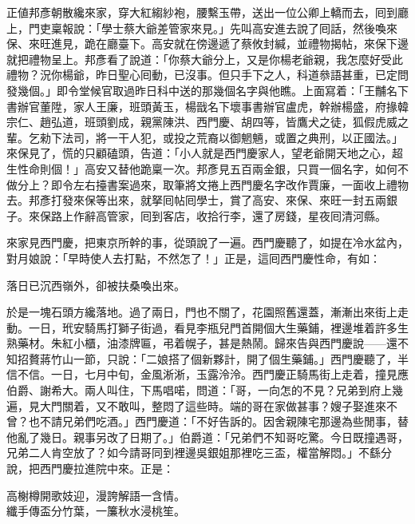 正値邦彥朝散纔來家，穿大紅縐紗袍，腰繫玉帶，送出一位公卿上轎而去，囘到廳上，門吏稟報說：「學士蔡大爺差管家來見。」先叫高安進去說了囘話，然後喚來保、來旺進見，跪在廳臺下。高安就在傍邊遞了蔡攸封緘，並禮物揭帖，來保下邊就把禮物呈上。邦彥看了說道：「你蔡大爺分上，又是你楊老爺親，我怎麼好受此禮物？況你楊爺，昨日聖心囘動，已沒事。但只手下之人，科道叅語甚重，已定問發幾個。」即令堂候官取過昨日科中送的那幾個名字與他瞧。上面寫着：「王黼名下書辦官董陞，家人王廉，班頭黃玉，楊戩名下壞事書辦官盧虎，幹辦楊盛，府掾韓宗仁、趙弘道，班頭劉成，親黨陳洪、西門慶、胡四等，皆鷹犬之徒，狐假虎威之輩。乞勑下法司，將一干人犯，或投之荒裔以御魍魎，或置之典刑，以正國法。」來保見了，慌的只顧磕頭，告道：「小人就是西門慶家人，望老爺開天地之心，超生性命則個！」高安又替他跪稟一次。邦彥見五百兩金銀，只買一個名字，如何不做分上？即令左右擡書案過來，取筆將文捲上西門慶名字改作賈廉，{}一面收上禮物去。邦彥打發來保等出來，就拏囘帖囘學士，賞了高安、來保、來旺一封五兩銀子。來保路上作辭高管家，囘到客店，收拾行李，還了房錢，星夜囘清河縣。

來家見西門慶，把東京所幹的事，從頭說了一遍。西門慶聽了，如提在冷水盆內，對月娘說：「早時使人去打點，不然怎了！」正是，這囘西門慶性命，有如：

\begin{myquote}
落日已沉西嶺外，卻被扶桑喚出來。
\end{myquote}

於是一塊石頭方纔落地。過了兩日，門也不關了，花園照舊還蓋，漸漸出來街上走動。{}一日，玳安騎馬打獅子街過，看見李瓶兒門首開個大生藥鋪，裡邊堆着許多生熟藥材。朱紅小櫃，油漆牌匾，弔着幌子，甚是熱鬧。歸來告與西門慶說——還不知招贅蔣竹山一節，只說：「二娘搭了個新夥計，開了個生藥鋪。」{}西門慶聽了，半信不信。一日，七月中旬，金風淅淅，玉露泠泠。西門慶正騎馬街上走着，撞見應伯爵、謝希大。兩人叫住，下馬唱喏，問道：「哥，一向怎的不見？兄弟到府上幾遍，見大門關着，又不敢叫，整悶了這些時。端的哥在家做甚事？嫂子娶進來不曾？也不請兄弟們吃酒。」西門慶道：「不好告訴的。因舍親陳宅那邊為些閒事，替他亂了幾日。親事另改了日期了。」伯爵道：「兄弟們不知哥吃驚。今日既撞遇哥，兄弟二人肯空放了？如今請哥同到裡邊吳銀姐那裡吃三盃，權當解悶。」不繇分說，把西門慶拉進院中來。正是：

\begin{myquote}
高榭樽開歌妓迎，漫誇解語一含情。\\纖手傳盃分竹葉，一簾秋水浸桃笙。
\end{myquote}

